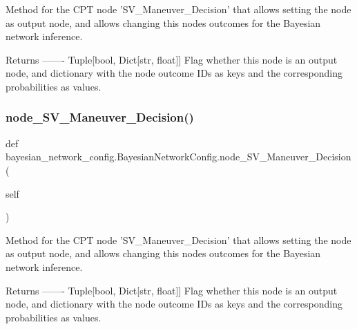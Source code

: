 \begin{DoxyVerb}Method for the CPT node 'SV_Maneuver_Decision' that allows setting the node as output node,
and allows changing this nodes outcomes for the Bayesian network inference.

Returns
-------
Tuple[bool, Dict[str, float]]
    Flag whether this node is an output node, and dictionary with the node outcome IDs as keys
    and the corresponding probabilities as values.
\end{DoxyVerb}
 \mbox{\label{classbayesian__network__config_1_1_bayesian_network_config_a978dd92b9826d22d6e521630d0a34379}} 
\subsubsection{\texorpdfstring{node\+\_\+\+S\+V\+\_\+\+Maneuver\+\_\+\+Decision()}{node\_SV\_Maneuver\_Decision()}\hspace{0.1cm}{\footnotesize\ttfamily [2/2]}}
{\footnotesize\ttfamily def bayesian\+\_\+network\+\_\+config.\+Bayesian\+Network\+Config.\+node\+\_\+\+S\+V\+\_\+\+Maneuver\+\_\+\+Decision (\begin{DoxyParamCaption}\item[{}]{self }\end{DoxyParamCaption})}

\begin{DoxyVerb}Method for the CPT node 'SV_Maneuver_Decision' that allows setting the node as output node, 
and allows changing this nodes outcomes for the Bayesian network inference.

Returns
-------
Tuple[bool, Dict[str, float]]
    Flag whether this node is an output node, and dictionary with the node outcome IDs as keys 
    and the corresponding probabilities as values.
\end{DoxyVerb}
 \mbox{\label{classbayesian__network__config_1_1_bayesian_network_config_a542c4ed5d49ca145684cfcff7a6e90f6}} 

